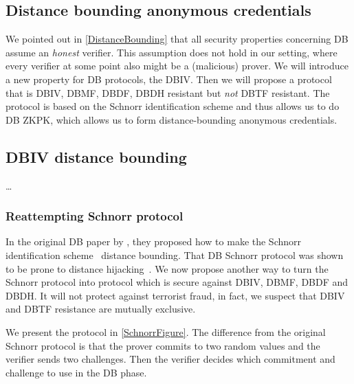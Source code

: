\subsection{Distance bounding anonymous credentials}%
\label{DB-anon-cred}


We pointed out in \cref{DistanceBounding} that all security properties 
concerning \ac{DB} assume an \emph{honest} verifier.
This assumption does not hold in our setting, where every verifier at some point 
also might be a (malicious) prover.
We will introduce a new property for \ac{DB} protocols, the \ac{DBIV}.
Then we will propose a protocol that is \ac{DBIV}, \ac{DBMF}, \ac{DBDF}, 
\ac{DBDH} resistant but \emph{not} \ac{DBTF} resistant.
The protocol is based on the Schnorr identification scheme and thus allows us to 
do \ac{DB} \ac{ZKPK}, which allows us to form distance-bounding anonymous 
credentials.

\subsection{\Acl{DBIV} distance bounding}

\dots

\subsubsection{Reattempting  Schnorr protocol}


In the original \ac{DB} paper by \citet{DistanceBounding}, they proposed how to 
make the Schnorr identification scheme~\cite{Schnorr} distance bounding.
That \ac{DB} Schnorr protocol was shown to be prone to distance 
hijacking~\cite{DistanceHijacking}.
We now propose another way to turn the Schnorr protocol into  protocol 
which is secure against \ac{DBIV}, \ac{DBMF}, \ac{DBDF} and \ac{DBDH}.
It will not protect against terrorist fraud, in fact, we suspect that \ac{DBIV} 
and \ac{DBTF} resistance are mutually exclusive.

We present the protocol in \cref{SchnorrFigure}.
The difference from the original Schnorr protocol is that the prover commits to 
two random values and the verifier sends two challenges.
Then the verifier decides which commitment and challenge to use in the \ac{DB} 
phase.

